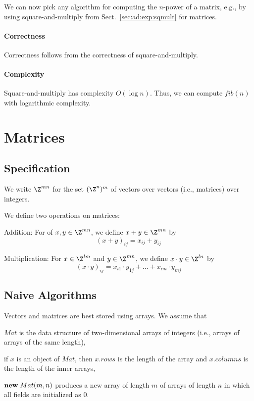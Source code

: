 We can now pick any algorithm for computing the $n$-power of a matrix, e.g., by using square-and-multiply from Sect.~\ref{sec:ad:exp:sqmult} for matrices.

\paragraph{Correctness}
Correctness follows from the correctness of square-and-multiply.

\paragraph{Complexity}
Square-and-multiply has complexity $O(\log n)$.
Thus, we can compute $fib(n)$ with logarithmic complexity.



\section{Matrices}\label{sec:ad:matrix}

\subsection{Specification}

We write $\Z^{mn}$ for the set $(\Z^n)^m$ of vectors over vectors (i.e., matrices) over integers.

We define two operations on matrices:
\begin{compactitem}
\item Addition: For of $x,y\in \Z^{mn}$, we define $x+y\in\Z^{mn}$ by
\[(x+y)_{ij}=x_{ij}+y_{ij}\]

\item Multiplication: For $x\in \Z^{lm}$ and $y\in \Z^{mn}$, we define $x\cdot y\in\Z^{ln}$ by
\[(x\cdot y)_{ij}=x_{i1}\cdot y_{1j} +\ldots +x_{im}\cdot y_{mj}\]
\end{compactitem}


\subsection{Naive Algorithms}

Vectors and matrices are best stored using arrays.
We assume that
\begin{compactitem}
 \item $Mat$ is the data structure of two-dimensional arrays of integers (i.e., arrays of arrays of the same length),
 \item if $x$ is an object of $Mat$, then $x.rows$ is the length of the array and $x.columns$ is the length of the inner arrays,
 \item ${\rm \bf new}\; Mat(m,n)$ produces a new array of length $m$ of arrays of length $n$ in which all fields are initialized as $0$.
\end{compactitem}

